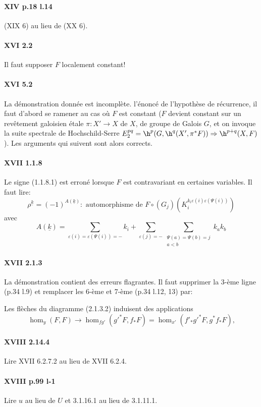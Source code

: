 \paragraph{XIV p.18 l.14}
(XIX 6) au lieu de (XX 6). 

\paragraph{XVI 2.2}
Il faut supposer $F$ localement constant!

\paragraph{XVI 5.2}
La démonstration donnée est incomplète.  l'énoncé de 
l'hypothèse de récurrence, il faut d'abord se ramener au cas o\`u $F$ est 
constant ($F$ devient constant sur un rev\^etement galoisien étale 
$\pi:X'\to X$ de $X$, de groupe de Galois $G$, et on invoque la suite spectrale 
de Hochschild-Serre $E_2^{p q}=\h^p(G,\h^q(X',\pi^\ast F))\Rightarrow \h^{p+q}(X,F)$). 
Les arguments qui suivent sont alors corrects. 

\paragraph{XVII 1.1.8}
Le signe (1.1.8.1) est erroné lorsque $F$ est contravariant en certaines 
variables. Il faut lire: 
\begin{equation*}\tag{1.1.8.1}
  \rho^{\underline k} = (-1)^{A(\underline k)}: \text{ automorphisme de }
F\circ (G_j)\left(K_i^{k_i\varepsilon(i)\varepsilon(\Psi(i))}\right) 
\end{equation*}
avec 
\[
  A(\underline k) = \sum_{\varepsilon(i) = \varepsilon(\Psi(i))=-} k_i + \sum_{\varepsilon(j)=-} \sum_{\substack{\Psi(a)=\Psi(b)=j \\ a<b}} k_a k_b 
\]

\paragraph{XVII 2.1.3}
La démonstration contient des erreurs flagrantes. Il faut supprimer la 
3-ème ligne (p.34 l.9) et remplacer les 6-ème et 7-ème (p.34 l.12, 13) 
par: 

Les flèches du diagramme (2.1.3.2) induisent des applications 
\[
  \hom_y(F,F) \to \hom_{f g'}({g'}^\ast F,f_\ast F) = \hom_{x'}(f'_\ast {g'}^\ast F,g^\ast f_\ast F) \text{,}
\]

\paragraph{XVIII 2.14.4}
Lire XVII 6.2.7.2 au lieu de XVII 6.2.4.

\paragraph{XVIII p.99 l-1}
Lire $u$ au lieu de $U$ et 3.1.16.1 au lieu de 3.1.11.1.


